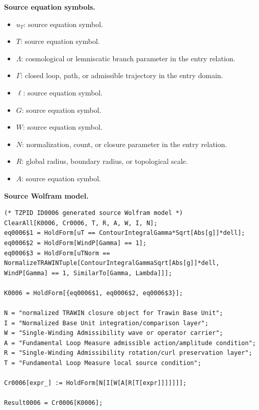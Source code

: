 \begin{minipage}[t]{0.49\linewidth}
\begingroup
\small
\raggedright
\textbf{Source equation symbols.}\par
\begin{itemize}[leftmargin=1.35em,itemsep=1pt,topsep=1pt,parsep=0pt]
    \item $u_{T}$: source equation symbol.
    \item $T$: source equation symbol.
    \item $\Lambda$: cosmological or lemniscatic branch parameter in the entry relation.
    \item $\Gamma$: closed loop, path, or admissible trajectory in the entry domain.
    \item $\ell$: source equation symbol.
    \item $G$: source equation symbol.
    \item $W$: source equation symbol.
    \item $N$: normalization, count, or closure parameter in the entry relation.
    \item $R$: global radius, boundary radius, or topological scale.
    \item $A$: source equation symbol.
\end{itemize}
\endgroup
\end{minipage}\hfill
\begin{minipage}[t]{0.47\linewidth}
\begingroup
\scriptsize
\raggedright
\textbf{Source Wolfram model.}\par
\begin{Verbatim}[fontsize=\tiny,breaklines=true,breakanywhere=true]
(* TZPID ID0006 generated source Wolfram model *)
ClearAll[K0006, Cr0006, T, R, A, W, I, N];
eq0006$1 = HoldForm[uT == ContourIntegralGamma*Sqrt[Abs[g]]*dell];
eq0006$2 = HoldForm[WindP[Gamma] == 1];
eq0006$3 = HoldForm[uTNorm == NormalizeTRAWINTuple[ContourIntegralGammaSqrt[Abs[g]]*dell, WindP[Gamma] == 1, SimilarTo[Gamma, Lambda]]];

K0006 = HoldForm[{eq0006$1, eq0006$2, eq0006$3}];

N = "normalized TRAWIN closure object for Trawin Base Unit";
I = "Normalized Base Unit integration/comparison layer";
W = "Single-Winding Admissibility wave or operator carrier";
A = "Fundamental Loop Measure admissible action/amplitude condition";
R = "Single-Winding Admissibility rotation/curl preservation layer";
T = "Fundamental Loop Measure local source condition";

Cr0006[expr_] := HoldForm[N[I[W[A[R[T[expr]]]]]]];

Result0006 = Cr0006[K0006];
\end{Verbatim}
\endgroup
\end{minipage}

